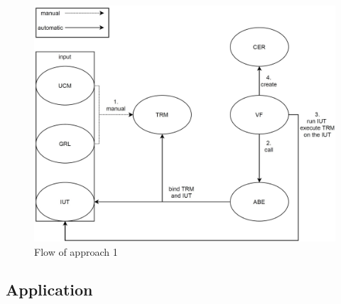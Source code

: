 \begin{figure}
	\centering
	\includegraphics[scale=0.4]{../images/08/08_controllFlow1.jpg} 
	\caption{Flow of approach 1}
	\label{fig:08_flowOf1}
\end{figure}

\newpage
\subsection{Application}
